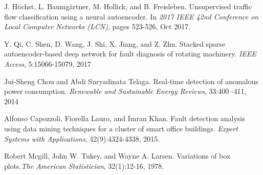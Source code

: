 \documentclass[conference]{IEEEtran}
\begin{document}
\begin{thebibliography}{00}
J. H{\"o}chst, L. Baumg{\"a}rtner, M. Hollick, and B. Freisleben. Unsupervised traffic flow classification using a neural autoencoder.
In \textit{2017 IEEE 42nd Conference on Local Computer Networks
	(LCN)}, pages 523-526, Oct 2017.

Y. Qi, C. Shen, D. Wang, J. Shi, X. Jiang, and Z. Zhu. Stacked
sparse autoencoder-based deep network for fault diagnosis of rotating machinery. \textit{IEEE Access}, 5:15066-15079, 2017

Jui-Sheng Chou and Abdi Suryadinata Telaga. Real-time detection of anomalous power consumption. \textit{Renewable and Sustainable Energy Reviews}, 33:400 -411, 2014

Alfonso Capozzoli, Fiorella Lauro, and Imran Khan. Fault detection analysis using data mining techniques for a cluster of smart
office buildings. \textit{Expert Systems with Applications}, 42(9):4324-4338, 2015.

Robert Mcgill, John W. Tukey, and Wayne A. Larsen. Variations
of box plots.\textit{The American Statistician}, 32(1):12-16, 1978.
\end{thebibliography}
\end{document}

